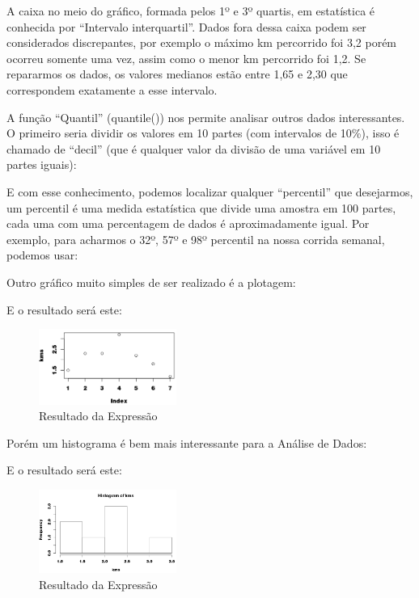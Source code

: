 \documentclass[a4paper,11pt]{article}
\begin{document}
A caixa no meio do gráfico, formada pelos 1º e 3º quartis, em estatística é conhecida por ``Intervalo interquartil''. Dados fora dessa caixa podem ser considerados discrepantes, por exemplo o máximo km percorrido foi 3,2 porém ocorreu somente uma vez, assim como o menor km percorrido foi 1,2. Se repararmos os dados, os valores medianos estão entre 1,65 e 2,30 que correspondem exatamente a esse intervalo.

A função ``Quantil'' (quantile()) nos permite analisar outros dados interessantes. O primeiro seria dividir os valores em 10 partes (com intervalos de 10\%), isso é chamado de ``decil'' (que é qualquer valor da divisão de uma 
variável em 10 partes iguais): \\

E com esse conhecimento, podemos localizar qualquer ``percentil'' que desejarmos, um percentil é uma medida estatística que divide uma amostra em 100 partes, cada uma com uma percentagem de dados é aproximadamente igual. Por exemplo, para acharmos o 32º, 57º e 98º percentil na nossa corrida semanal, podemos usar: \\

Outro gráfico muito simples de ser realizado é a plotagem: \\

E o resultado será este:
\begin{figure}[H]
	\centering
	\includegraphics[width=0.4\textwidth]{imagens/grafico03.png}
	\caption{Resultado da Expressão}
\end{figure}

Porém um histograma é bem mais interessante para a Análise de Dados: \\

E o resultado será este:
\begin{figure}[H]
	\centering
	\includegraphics[width=0.4\textwidth]{imagens/grafico02.png}
	\caption{Resultado da Expressão}
\end{figure}
\end{document}
